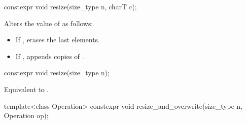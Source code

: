 %
\begin{itemdecl}
constexpr void resize(size_type n, charT c);
\end{itemdecl}

\begin{itemdescr}
\pnum
\effects
Alters the value of
as follows:
\begin{itemize}
\item
If
,
erases the last  elements.
\item
If
,
appends  copies of .
\end{itemize}
\end{itemdescr}

%
\begin{itemdecl}
constexpr void resize(size_type n);
\end{itemdecl}

\begin{itemdescr}
\pnum
\effects
Equivalent to .
\end{itemdescr}

%
\begin{itemdecl}
template<class Operation> constexpr void resize_and_overwrite(size_type n, Operation op);
\end{itemdecl}

